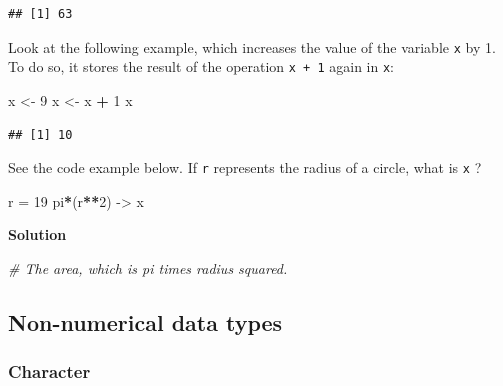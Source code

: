 \documentclass[
]{scrartcl}
\makeatletter
\newenvironment{Shaded}{\begin{snugshade}}{\end{snugshade}}
\newcommand{\CommentTok}[1]{\textcolor[rgb]{0.56,0.35,0.01}{\textit{#1}}}
\newcommand{\DecValTok}[1]{\textcolor[rgb]{0.00,0.00,0.81}{#1}}
\newcommand{\NormalTok}[1]{#1}
\newcommand{\OtherTok}[1]{\textcolor[rgb]{0.56,0.35,0.01}{#1}}
\newcommand{\SpecialCharTok}[1]{\textcolor[rgb]{0.81,0.36,0.00}{\textbf{#1}}}
\newenvironment{kframe}{%
\medskip{}
\setlength{\fboxsep}{.8em}
 \def\at@end@of@kframe{}%
 \ifinner\ifhmode%
  \def\at@end@of@kframe{\end{minipage}}%
  \begin{minipage}{\columnwidth}%
 \fi\fi%
 \def\FrameCommand##1{\hskip\@totalleftmargin \hskip-\fboxsep
 \colorbox{shadecolor}{##1}\hskip-\fboxsep
     \hskip-\linewidth \hskip-\@totalleftmargin \hskip\columnwidth}%
 \MakeFramed {\advance\hsize-\width
   \@totalleftmargin\z@ \linewidth\hsize
   \@setminipage}}%
 {\par\unskip\endMakeFramed%
 \at@end@of@kframe}
\newenvironment{rmdblock}[1]
  {
  \begin{itemize}
  \renewcommand{\labelitemi}{
    \raisebox{-.7\height}[0pt][0pt]{
      {\setkeys{Gin}{width=3em,keepaspectratio}\texttt{[image: images/\#1]}}
    }
  }
  \setlength{\fboxsep}{1em}
  \begin{kframe}
  \item
  }
  {
  \end{kframe}
  \end{itemize}
  }
\newenvironment{myexercise}
    {\begin{rmdblock}{exercise_green}}
    {\end{rmdblock}}
\newenvironment{webexsolution}[1]
    {\par\tiny\textbf{#1}}
    {\par}
\newcommand{\webexhide}[1]{\begin{webexsolution}{#1}}
\newcommand{\webexunhide}{\end{webexsolution}}
\makeatother
\begin{document}
\begin{verbatim}
## [1] 63
\end{verbatim}

Look at the following example, which increases the value of the variable \texttt{x} by 1. To do so, it stores the result of the operation \texttt{x\ +\ 1} again in \texttt{x}:

\begin{Shaded}
\begin{Highlighting}[]
\NormalTok{x }\OtherTok{\textless{}{-}} \DecValTok{9}
\NormalTok{x }\OtherTok{\textless{}{-}}\NormalTok{ x }\SpecialCharTok{+} \DecValTok{1}
\NormalTok{x}
\end{Highlighting}
\end{Shaded}

\begin{verbatim}
## [1] 10
\end{verbatim}

\begin{myexercise}
See the code example below. If \texttt{r} represents the radius of a
circle, what is \texttt{x} ?
\end{myexercise}

\begin{Shaded}
\begin{Highlighting}[]
\NormalTok{r }\OtherTok{=} \DecValTok{19}
\NormalTok{pi}\SpecialCharTok{*}\NormalTok{(r}\SpecialCharTok{**}\DecValTok{2}\NormalTok{) }\OtherTok{{-}\textgreater{}}\NormalTok{ x}
\end{Highlighting}
\end{Shaded}

\webexhide{Solution}

\begin{Shaded}
\begin{Highlighting}[]
\CommentTok{\# The area, which is pi times radius squared.}
\end{Highlighting}
\end{Shaded}

\webexunhide

\subsection{Non-numerical data types}\label{non-numerical-data-types}

\subsubsection{Character}\label{character}
\end{document}
